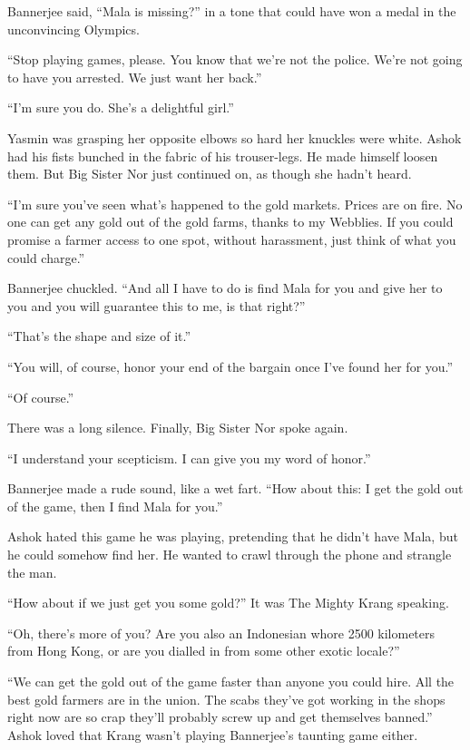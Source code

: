 Bannerjee said, ``Mala is missing?'' in a tone that could have won a
medal in the unconvincing Olympics.

``Stop playing games, please. You know that we're not the police.
We're not going to have you arrested. We just want her back.''

``I'm sure you do. She's a delightful girl.''

Yasmin was grasping her opposite elbows so hard her knuckles were
white. Ashok had his fists bunched in the fabric of his
trouser-legs. He made himself loosen them. But Big Sister Nor just
continued on, as though she hadn't heard.

``I'm sure you've seen what's happened to the gold markets. Prices
are on fire. No one can get any gold out of the gold farms, thanks
to my Webblies. If you could promise a farmer access to one spot,
without harassment, just think of what you could charge.''

Bannerjee chuckled. ``And all I have to do is find Mala for you and
give her to you and you will guarantee this to me, is that right?''

``That's the shape and size of it.''

``You will, of course, honor your end of the bargain once I've found
her for you.''

``Of course.''

There was a long silence. Finally, Big Sister Nor spoke again.

``I understand your scepticism. I can give you my word of honor.''

Bannerjee made a rude sound, like a wet fart. ``How about this: I
get the gold out of the game, then I find Mala for you.''

Ashok hated this game he was playing, pretending that he didn't
have Mala, but he could somehow find her. He wanted to crawl
through the phone and strangle the man.

``How about if we just get you some gold?'' It was The Mighty Krang
speaking.

``Oh, there's more of you? Are you also an Indonesian whore 2500
kilometers from Hong Kong, or are you dialled in from some other
exotic locale?''

``We can get the gold out of the game faster than anyone you could
hire. All the best gold farmers are in the union. The scabs they've
got working in the shops right now are so crap they'll probably
screw up and get themselves banned.'' Ashok loved that Krang wasn't
playing Bannerjee's taunting game either.

